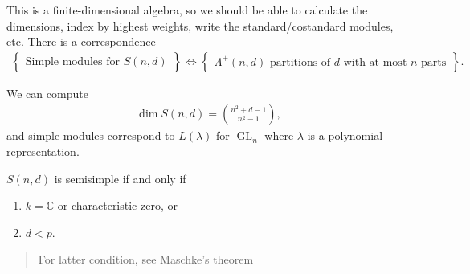 \begin{remark}

\begin{remark}

This is a finite-dimensional algebra, so we should be able to calculate
the dimensions, index by highest weights, write the standard/costandard
modules, etc. There is a correspondence
\begin{align*}  \left\{{\substack{\text{Simple modules for }S(n, d)}}\right\} \iff \left\{{\substack{\Lambda^+(n, d) \text{ partitions of $d$ with at most $n$ parts}}}\right\} .\end{align*}

We can compute
\begin{align*}   \dim S(n, d) = {n^2 + d - 1 \choose n^2 - 1} ,\end{align*}
and simple modules correspond to \(L(\lambda)\) for
\(\operatorname{GL}_n\) where \(\lambda\) is a polynomial
representation.

\end{remark}

\end{remark}

\begin{theorem}[?]

\begin{theorem}[?]

\(S(n, d)\) is semisimple if and only if

\begin{enumerate}
\def\labelenumi{\arabic{enumi}.}
\item
  \(k = {\mathbb{C}}\) or characteristic zero, or
\item
  \(d < p\).
\end{enumerate}

\begin{quote}
For latter condition, see Maschke's theorem
\end{quote}

\end{theorem}

\end{theorem}

